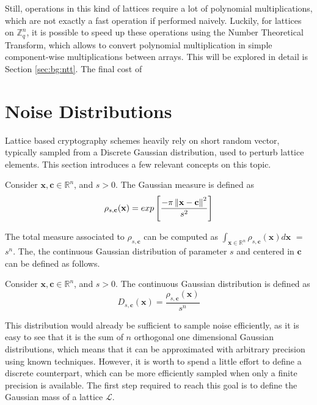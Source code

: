 \begin{definition}

\end{definition}

Still, operations in this kind of lattices require a lot of polynomial multiplications, which are not exactly a fast operation if performed naively. Luckily, for lattices on $\mathbb{Z}_q^n$, it is possible to speed up these operations using the Number Theoretical Transform, which allows to convert polynomial multiplication in simple component-wise multiplications between arrays. This will be explored in detail is Section \ref{sec:bg:ntt}. The final cost of 

\section{Noise Distributions}
Lattice based cryptography schemes heavily rely on short random vector, typically sampled from a Discrete Gaussian distribution, used to perturb lattice elements. This section introduces a few relevant concepts on this topic.\\

\begin{definition}
Consider $\mathbf{x},\mathbf{c}\in\mathbb{R}^n$, and $s>0$. The Gaussian measure is defined as
\begin{equation*}
\rho_{s,\mathbf{c}}(\mathbf{x}) = exp\left[\frac{-\pi\left\lVert \mathbf{x}-\mathbf{c} \right\rVert^2}{s^2}\right]
\end{equation*}
\end{definition}

The total measure associated to $\rho_{s,\mathbf{c}}$ can be computed as $\int_{\mathbf{x}\in\mathbb{R}^n}\rho_{s,\mathbf{c}}(\mathbf{x})d\mathbf{x}$ $=$ $s^n$. The, the continuous Gaussian distribution of parameter $s$ and centered in $\mathbf{c}$ can be defined as follows.

\begin{definition}
Consider $\mathbf{x},\mathbf{c}\in\mathbb{R}^n$, and $s>0$. The continuous Gaussian distribution is defined as
\begin{equation*}
D_{s,\mathbf{c}}(\mathbf{x})=\frac{\rho_{s,\mathbf{c}}(\mathbf{x})}{s^n}
\end{equation*}
\end{definition}

This distribution would already be sufficient to sample noise efficiently, as it is easy to see that it is the sum of $n$ orthogonal one dimensional Gaussian distributions, which means that it can be approximated with arbitrary precision using known techniques. However, it is worth to spend a little effort to define a discrete counterpart, which can be more efficiently sampled when only a finite precision is available. The first step required to reach this goal is to define the Gaussian mass of a lattice $\mathscr{L}$.

